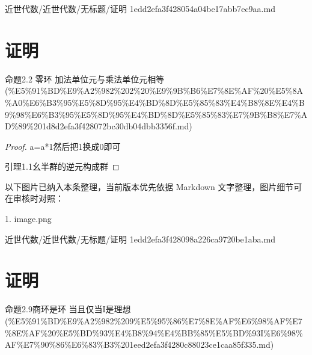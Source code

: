 \begin{note}[来源路径]

近世代数/近世代数/无标题/证明 1edd2efa3f428054a04be17abb7ec9aa.md

\end{note}

\section*{证明}

\begin{note}[来源上级主题]

命题2.2 零环 加法单位元与乘法单位元相等 (\%E5\%91\%BD\%E9\%A2\%982\%202\%20\%E9\%9B\%B6\%E7\%8E\%AF\%20\%E5\%8A\%A0\%E6\%B3\%95\%E5\%8D\%95\%E4\%BD\%8D\%E5\%85\%83\%E4\%B8\%8E\%E4\%B9\%98\%E6\%B3\%95\%E5\%8D\%95\%E4\%BD\%8D\%E5\%85\%83\%E7\%9B\%B8\%E7\%AD\%89\%201d8d2efa3f428072bc30db04dbb3356f.md)

\end{note}

\begin{proof}

a=a*1然后把1换成0即可

引理1.1幺半群的逆元构成群

\end{proof}

\begin{note}[关联图片]
以下图片已纳入本条整理，当前版本优先依据 Markdown 文字整理，图片细节可在审核时对照：

1. image.png\\

\end{note}

\begin{note}[来源路径]

近世代数/近世代数/无标题/证明 1edd2efa3f428098a226ca9720be1aba.md

\end{note}

\section*{证明}

\begin{note}[来源上级主题]

命题2.9商环是环 当且仅当I是理想 (\%E5\%91\%BD\%E9\%A2\%982\%209\%E5\%95\%86\%E7\%8E\%AF\%E6\%98\%AF\%E7\%8E\%AF\%20\%E5\%BD\%93\%E4\%B8\%94\%E4\%BB\%85\%E5\%BD\%93I\%E6\%98\%AF\%E7\%90\%86\%E6\%83\%B3\%201eed2efa3f4280c88023ce1caa85f335.md)

\end{note}

